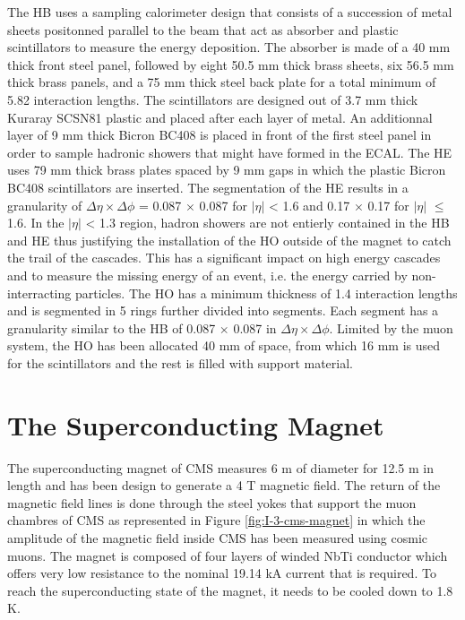     The HB uses a sampling calorimeter design that consists of a succession of metal sheets positonned parallel to the beam that act as absorber and plastic scintillators to measure the energy deposition. The absorber is made of a 40 mm thick front steel panel, followed by eight 50.5 mm thick brass sheets, six 56.5 mm thick brass panels, and a 75 mm thick steel back plate for a total minimum of 5.82 interaction lengths. The scintillators are designed out of 3.7 mm thick Kuraray SCSN81 plastic and placed after each layer of metal. An additionnal layer of 9 mm thick Bicron BC408 is placed in front of the first steel panel in order to sample hadronic showers that might have formed in the ECAL. The HE uses 79 mm thick brass plates spaced by 9 mm gaps in which the plastic Bicron BC408 scintillators are inserted. The segmentation of the HE results in a granularity of $ \Delta \eta \times \Delta \phi $ = 0.087 $ \times $ 0.087 for $ | \eta | $ < 1.6 and 0.17 $ \times $ 0.17 for $ | \eta | $ $ \le $ 1.6. In the $ | \eta | $ < 1.3 region, hadron showers are not entierly contained in the HB and HE thus justifying the installation of the HO outside of the magnet to catch the trail of the cascades. This has a significant impact on high energy cascades and to measure the missing energy of an event, i.e. the energy carried by non-interracting particles. The HO has a minimum thickness of 1.4 interaction lengths and is segmented in 5 rings further divided into segments. Each segment has a granularity similar to the HB of 0.087 $ \times $ 0.087 in $ \Delta \eta \times \Delta \phi $. Limited by the muon system, the HO has been allocated 40 mm of space, from which 16 mm is used for the scintillators and the rest is filled with support material.

  \section{The Superconducting Magnet}

    The superconducting magnet of CMS measures 6 m of diameter for 12.5 m in length and has been design to generate a 4 T magnetic field. The return of the magnetic field lines is done through the steel yokes that support the muon chambres of CMS as represented in Figure  \ref{fig:I-3-cms-magnet} in which the amplitude of the magnetic field inside CMS has been measured using cosmic muons. The magnet is composed of four layers of winded NbTi conductor which offers very low resistance to the nominal 19.14 kA current that is required. To reach the superconducting state of the magnet, it needs to be cooled down to 1.8 K. \\


